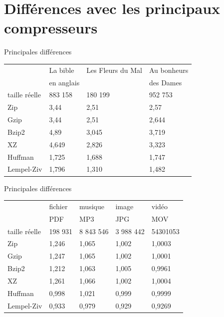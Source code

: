 \documentclass[french]{beamer}
\begin{document}
\section{Différences avec les principaux compresseurs}
\begin{frame}{Principales différences}
	\begin{flushleft}
\begin{tabular}{|l|l|l|l|}
\hline
 & La bible & Les Fleurs du Mal  & Au bonheurs \\
 & en anglais & & des Dames \\ 
\hline
taille réelle & 883 158 & 180 199 & 952 753  \\\hline
Zip & 3,44 & 2,51 & 2,57  \\
\hline
Gzip & 3,44 & 2,51 & 2,644 \\
\hline
Bzip2 & 4,89 & 3,045 & 3,719 \\
\hline
XZ & 4,649 & 2,826 & 3,323 \\
\hline
Huffman & 1,725 & 1,688 & 1,747  \\
\hline
Lempel-Ziv & 1,796 & 1,310 & 1,482 \\
\hline

\end{tabular}
\end{flushleft}
\end{frame}

\begin{frame}{Principales différences}
	\begin{flushleft}
\begin{tabular}{|l|l|l|l|l|}
\hline
 & fichier & musique & image & vidéo\\
 &  PDF & MP3 & JPG & MOV \\ 
\hline
taille réelle &  198 931 & 8 843 546 & 3 988 442 & 54301053 \\\hline
Zip  & 1,246 & 1,065 & 1,002 & 1,0003 \\
\hline
Gzip & 1,247 & 1,065 & 1,002 & 1,0001 \\
\hline
Bzip2 & 1,212 & 1,063 & 1,005 & 0,9961\\
\hline
XZ & 1,261 & 1,066 & 1,002 & 1,0004\\
\hline
Huffman & 0,998 & 1,021 & 0,999 & 0,9999 \\
\hline
Lempel-Ziv & 0,933 & 0,979 & 0,929 & 0,9269\\
\hline

\end{tabular}
\end{flushleft}
\end{frame}
\end{document}
